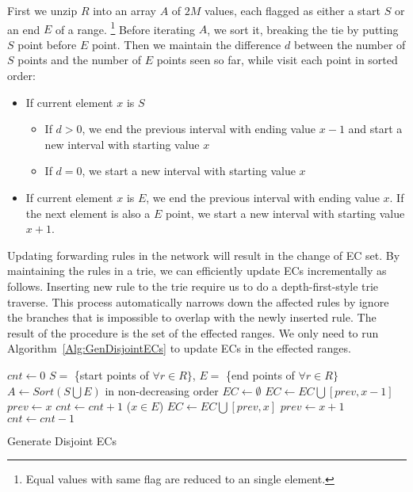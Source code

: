First we unzip $R$ into an array $A$ of $2M$ values,
each flagged as either a start $S$ or an end $E$ of a range.
\footnote{Equal values with same flag are reduced to an single element.}
Before iterating $A$, we sort it, breaking the tie by putting $S$ point before $E$ point.
Then we maintain the difference $d$ between the number of $S$ points and the number of $E$ points
seen so far, while visit each point in sorted order:
\begin{itemize}
\item If current element $x$ is $S$
        \begin{itemize}
                \item If $d > 0$, we end the previous interval with ending value $x - 1$
                        and start a new interval with starting value $x$
                \item If $d = 0$, we start a new interval with starting value $x$
        \end{itemize}
\item If current element $x$ is $E$, we end the previous interval with ending value $x$.
        If the next element is also a $E$ point, we start a new interval with starting value
        $x + 1$.
\end{itemize}

Updating forwarding rules in the network will result in the change of EC set.
By maintaining the rules in a trie, we can efficiently update ECs incrementally as follows.
Inserting new rule to the trie require us to do a depth-first-style trie traverse.
This process automatically narrows down the affected rules by ignore the branches
that is impossible to overlap with the newly inserted rule.
The result of the procedure is the set of the effected ranges.
We only need to run Algorithm~\ref{Alg:GenDisjointECs} to update ECs in the effected ranges.

\begin{algorithm}[h]
\DontPrintSemicolon
{}
$cnt \gets 0$\;
$S = $ \{start points of $\forall r \in R\}$, $E = $ \{end points of $\forall r \in R\}$\;
$A \gets Sort(S \bigcup E)$ in non-decreasing order\;
$EC \gets \emptyset$\;
 {
         {
                 {
                        $EC \gets EC \bigcup [prev, x-1]$\;
                }
                $prev \gets x$\;
                $cnt \gets cnt + 1$\;
        }
        \Else ($x \in E$) {
                $EC \gets EC \bigcup [prev, x]$\;
                $prev \gets x + 1$\;
                $cnt \gets cnt - 1$\;
        }
}
\caption{Generate Disjoint ECs\label{Alg:GenDisjointECs}}
\end{algorithm}

